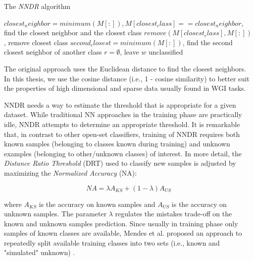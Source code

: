 \begin{algorithm}[t]
\caption{The \textit{NNDR} algorithm}
\label{alg:NNDR_algorithm}

$closest_neighbor = minimum(M[:]), M[closest_class]==closest_neighbor$, find the closest neighbor and the closest class\;
$remove(M[closest_class],M[:])$, remove closest class\;
$second_closest = minimum(M[:])$, find the second closest neighbor of another class\;
    {$r = \emptyset$, leave $w$ unclassified\;}

\end{algorithm}

The original approach uses the Euclidean distance to find the closest neighbors. In this thesis, we use the cosine distance (i.e., 1 - cosine similarity) to better suit the properties of high dimensional and sparse data usually found in WGI tasks. 

NNDR needs a way to estimate the threshold that is appropriate for a given dataset. While traditional NN approaches in the training phase are practically idle, NNDR attempts to determine an appropriate threshold. It is remarkable that, in contrast to other open-set classifiers, training of NNDR requires both known samples (belonging to classes known during training) and unknown examples (belonging to other/unknown classes) of interest. In more detail, the \textit{Distance Ratio Threshold} (DRT) used to classify new samples is adjusted by maximizing the \textit{Normalized Accuracy} (NA):

\begin{equation}
NA = \lambda A_{KS} + (1 - \lambda) A_{US}
\end{equation}

\nointend where $A_{KS}$ is the accuracy on known samples and $A_{US}$ is the accuracy on unknown samples. The parameter $\lambda$ regulates the mistakes trade-off on the known and unknown samples prediction. Since usually in training phase only samples of known classes are available, Mendes et al. proposed an approach to repeatedly split available training classes into two sets (i.e., known and "simulated" unknown) . 

